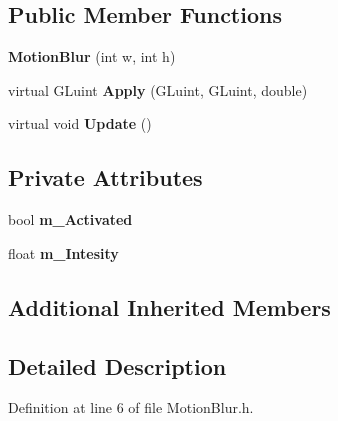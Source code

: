 \subsection*{Public Member Functions}
\begin{DoxyCompactItemize}
\item 
{\bfseries Motion\+Blur} (int w, int h)\hypertarget{class_post_process_1_1_motion_blur_ab64efc742e2a6350fa657aa5481b03f7}{}\label{class_post_process_1_1_motion_blur_ab64efc742e2a6350fa657aa5481b03f7}

\item 
virtual G\+Luint {\bfseries Apply} (G\+Luint, G\+Luint, double)\hypertarget{class_post_process_1_1_motion_blur_a98518684a26d34c4e68da0eaec44583d}{}\label{class_post_process_1_1_motion_blur_a98518684a26d34c4e68da0eaec44583d}

\item 
virtual void {\bfseries Update} ()\hypertarget{class_post_process_1_1_motion_blur_a705b652f292c9329008475c318e499b2}{}\label{class_post_process_1_1_motion_blur_a705b652f292c9329008475c318e499b2}

\end{DoxyCompactItemize}
\subsection*{Private Attributes}
\begin{DoxyCompactItemize}
\item 
bool {\bfseries m\+\_\+\+Activated}\hypertarget{class_post_process_1_1_motion_blur_a1e495d877fc2e7f12c98db0496841104}{}\label{class_post_process_1_1_motion_blur_a1e495d877fc2e7f12c98db0496841104}

\item 
float {\bfseries m\+\_\+\+Intesity}\hypertarget{class_post_process_1_1_motion_blur_af51567909ce4f5874adcefe6fd2d1bc7}{}\label{class_post_process_1_1_motion_blur_af51567909ce4f5874adcefe6fd2d1bc7}

\end{DoxyCompactItemize}
\subsection*{Additional Inherited Members}


\subsection{Detailed Description}


Definition at line 6 of file Motion\+Blur.\+h.

